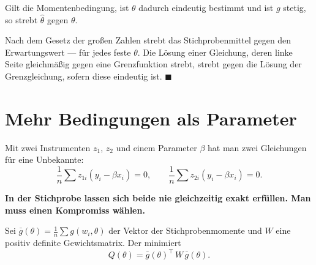 \begin{merksatz}
Gilt die Momentenbedingung, ist $\theta$ dadurch eindeutig bestimmt und ist $g$ stetig, so strebt $\hat\theta$ gegen $\theta$.

Nach dem Gesetz der großen Zahlen strebt das Stichprobenmittel gegen den Erwartungswert --- für jedes feste $\theta$. Die Lösung einer Gleichung, deren linke Seite gleichmäßig gegen eine Grenzfunktion strebt, strebt gegen die Lösung der Grenzgleichung, sofern diese eindeutig ist. $\blacksquare$

\begin{center}
\begin{minipage}{0.88\textwidth}
\end{minipage}
\end{center}
\end{merksatz}

\section{Mehr Bedingungen als Parameter}

\begin{merksatz}
Mit zwei Instrumenten $z_1$, $z_2$ und einem Parameter $\beta$ hat man zwei Gleichungen für eine Unbekannte:
\[ \frac1n\sum z_{1i}(y_i-\beta x_i) = 0, \qquad \frac1n\sum z_{2i}(y_i-\beta x_i) = 0 . \]

\begin{center}
\begin{minipage}{0.9\textwidth}
\textbf{In der Stichprobe lassen sich beide nie gleichzeitig exakt erfüllen. Man muss einen Kompromiss wählen.}
\end{minipage}
\end{center}
\end{merksatz}

\begin{definition}
Sei $\bar g(\theta) = \frac1n\sum g(w_i,\theta)$ der Vektor der Stichprobenmomente und $W$ eine positiv definite Gewichtsmatrix. Der  minimiert
\[ Q(\theta) = \bar g(\theta)^{\top}\,W\,\bar g(\theta) . \]
\end{definition}

